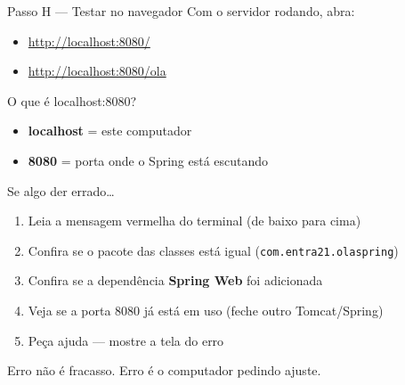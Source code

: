 \documentclass[aspectratio=169,11pt]{beamer}
\begin{document}
\begin{frame}{Passo H --- Testar no navegador}
  Com o servidor rodando, abra:

  \vspace{0.5em}
  \begin{itemize}
    \item \url{http://localhost:8080/}
    \item \url{http://localhost:8080/ola}
  \end{itemize}

  \vspace{0.8em}
  \begin{block}{O que é localhost:8080?}
    \begin{itemize}
      \item \textbf{localhost} = este computador
      \item \textbf{8080} = porta onde o Spring está escutando
    \end{itemize}
  \end{block}
\end{frame}

\begin{frame}{Se algo der errado\ldots}
  \begin{enumerate}
    \item Leia a mensagem vermelha do terminal (de baixo para cima)
    \item Confira se o pacote das classes está igual (\texttt{com.entra21.olaspring})
    \item Confira se a dependência \textbf{Spring Web} foi adicionada
    \item Veja se a porta 8080 já está em uso (feche outro Tomcat/Spring)
    \item Peça ajuda --- mostre a tela do erro
  \end{enumerate}

  \vspace{0.6em}
  Erro não é fracasso. Erro é o computador pedindo ajuste.
\end{frame}
\end{document}
